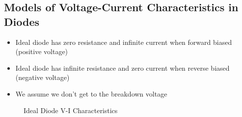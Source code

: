 \subsection*{Models of Voltage-Current Characteristics in Diodes}
\begin{definition}
    \begin{itemize}
        \item Ideal diode has zero resistance and infinite current when forward biased (positive voltage)
        \item Ideal diode has infinite resistance and zero current when reverse biased (negative voltage)
        \item We assume we don't get to the breakdown voltage
    \end{itemize}
    \begin{figure}[H]
        \centering
        \caption{Ideal Diode V-I Characteristics}
    \end{figure}

\end{definition}

